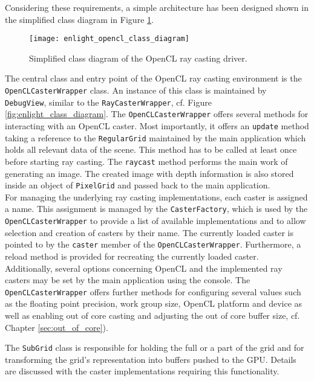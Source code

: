 Considering these requirements, a simple architecture has been designed shown in the simplified class diagram in Figure \ref{fig:enlight_opencl_class_diagram}.

\begin{figure}
\centering
\texttt{[image: enlight\_opencl\_class\_diagram]}
\caption{Simplified class diagram of the OpenCL ray casting driver.}
\label{fig:enlight_opencl_class_diagram}
\end{figure}

The central class and entry point of the OpenCL ray casting environment is the \lstinline!OpenCLCasterWrapper! class. An instance of this class is maintained by \lstinline!DebugView!, similar to the \lstinline!RayCasterWrapper!, cf. Figure \ref{fig:enlight_class_diagram}. The \lstinline!OpenCLCasterWrapper! offers several methods for interacting with an OpenCL caster. Most importantly, it offers an \lstinline!update! method taking a reference to the \lstinline!RegularGrid! maintained by the main application which holds all relevant data of the scene. This method has to be called at least once before starting ray casting. The \lstinline!raycast! method performs the main work of generating an image. The created image with depth information is also stored inside an object of \lstinline!PixelGrid! and passed back to the main application. \\
For managing the underlying ray casting implementations, each caster is assigned a name. This assignment is managed by the \lstinline!CasterFactory!, which is used by the \lstinline!OpenCLCasterWrapper! to provide a list of available implementations and to allow selection and creation of casters by their name. The currently loaded caster is pointed to by the \lstinline!caster! member of the \lstinline!OpenCLCasterWrapper!. Furthermore, a reload method is provided for recreating the currently loaded caster. \\
Additionally, several options concerning OpenCL and the implemented ray casters may be set by the main application using the console. The \lstinline!OpenCLCasterWrapper! offers further methods for configuring several values such as the floating point precision, work group size, OpenCL platform and device as well as enabling out of core casting and adjusting the out of core buffer size, cf. Chapter \ref{sec:out_of_core}).

The \lstinline!SubGrid! class is responsible for holding the full or a part of the grid and for transforming the grid's representation into buffers pushed to the GPU. Details are discussed with the caster implementations requiring this functionality.

